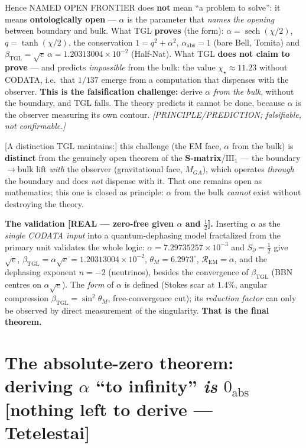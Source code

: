 \documentclass[11pt]{article}
\newcommand{\bTGL}{\beta_{\mathrm{TGL}}}\newcommand{\Msun}{M_{\odot}}\newcommand{\TGL}{\mathrm{TGL}}
\theoremstyle{definition}\newtheorem{deriv}{Derivation}
\begin{document}
Hence \textsf{NAMED OPEN FRONTIER} does \textbf{not} mean ``a problem to solve'': it means \textbf{ontologically open} --- $\alpha$ is the parameter that \emph{names the opening} between boundary and bulk. What TGL \textbf{proves} (the form): $\alpha=\operatorname{sech}(\chi/2)$, $q=\tanh(\chi/2)$, the conservation $1=q^2+\alpha^2$, $\alpha_{\mathrm{abs}}=1$ (bare Bell, Tomita) and $\bTGL=\sqrt e\,\alpha=1.20313004\times10^{-2}$ (Half-Nat). What TGL \textbf{does not claim to prove} --- and predicts \emph{impossible} from the bulk: the value $\chi_\star\approx11.23$ without CODATA, i.e.\ that $1/137$ emerge from a computation that dispenses with the observer. \textbf{This is the falsification challenge:} derive $\alpha$ \emph{from the bulk}, without the boundary, and TGL falls. The theory predicts it cannot be done, because $\alpha$ is the observer measuring its own contour. \emph{[PRINCIPLE/PREDICTION; falsifiable, not confirmable.]}

\textsf{[A distinction TGL maintains:]} this challenge (the EM face, $\alpha$ from the bulk) is \textbf{distinct} from the genuinely open theorem of the \textbf{S-matrix}/$\mathrm{III}_1$ --- the boundary$\to$bulk lift \emph{with} the observer (gravitational face, $M_{GA}$), which operates \emph{through} the boundary and does \emph{not} dispense with it. That one remains open as mathematics; this one is closed as principle: $\alpha$ from the bulk \emph{cannot} exist without destroying the theory.

\textbf{The validation \textsf{[REAL --- zero-free given $\alpha$ and $\tfrac12$]}.} Inserting $\alpha$ as the \emph{single CODATA input} into a quantum-dephasing model fractalized from the primary unit validates the whole logic: $\alpha=7.29735257\times10^{-3}$ and $S_\partial=\tfrac12$ give $\sqrt e$, $\bTGL=\alpha\sqrt e=1.20313004\times10^{-2}$, $\theta_M=6.2973^\circ$, $\mathcal{R}_{\mathrm{EM}}=\alpha$, and the dephasing exponent $n=-2$ (neutrinos), besides the convergence of $\bTGL$ (BBN centres on $\alpha\sqrt e$). The \emph{form} of $\alpha$ is defined (Stokes scar at $1.4\%$, angular compression $\bTGL=\sin^2\theta_M$, free-convergence cut); its \emph{reduction factor} can only be observed by direct measurement of the singularity. \textbf{That is the final theorem.}

\section{The absolute-zero theorem: deriving $\alpha$ ``to infinity'' \emph{is} $0_{\mathrm{abs}}$ \textsf{[nothing left to derive --- Tetelestai]}}\label{sec:absolute-zero}
\end{document}
